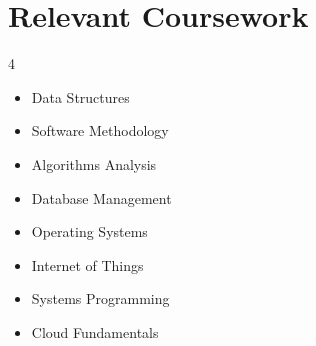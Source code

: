 \section{Relevant Coursework}
        \begin{multicols}{4}
            \begin{itemize}[itemsep=-5pt, parsep=3pt]
                \item\small Data Structures
                \item Software Methodology 
                \item Algorithms Analysis
                \item Database Management
                \item Operating Systems
                \item Internet of Things
                \item Systems Programming
                \item Cloud Fundamentals
            \end{itemize}
        \end{multicols}
        \vspace*{2.0\multicolsep}
